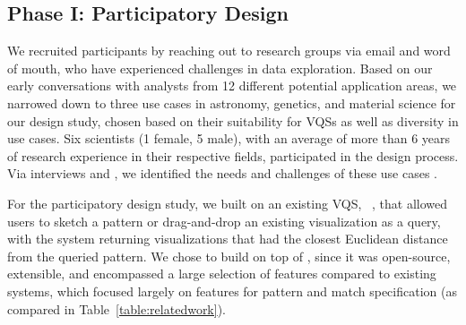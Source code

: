 \subsection{Phase I: Participatory Design}
\par We recruited participants by reaching out to research groups via email and word of mouth, who have experienced challenges in data exploration. Based on our early conversations with analysts from 12 different potential application areas, we narrowed down to three use cases in astronomy, genetics, and material science for our design study, chosen based on their suitability for VQSs as well as diversity in use cases. Six scientists (1 female, 5 male), with an average of more than 6 years of research experience in their respective fields, participated in the design process. Via interviews and , we identified the needs and challenges of these use cases . %
\par For the participatory design study, we built on an existing VQS, \zv~\cite{Siddiqui2017,Siddiqui2017VLDB}, that allowed users to sketch a pattern or drag-and-drop an existing visualization as a query, with the system returning visualizations that had the closest Euclidean distance from the queried pattern. We chose to build on top of \zv, since it was open-source, extensible, and encompassed a large selection of features compared to existing systems, which focused largely on features for pattern and match specification (as compared in Table~\ref{table:relatedwork}). %
